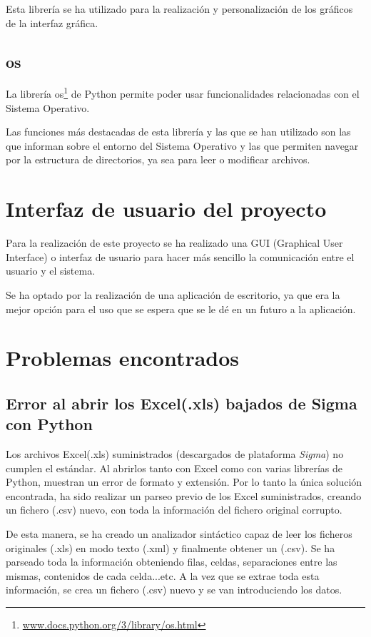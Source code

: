 Esta librería se ha utilizado para la realización y personalización de los gráficos de la interfaz gráfica.


\subsection{os}
La librería os\footnote{\href{https://docs.python.org/3/library/os.html}{www.docs.python.org/3/library/os.html}} de Python permite poder usar funcionalidades relacionadas con el Sistema Operativo. 

Las funciones más destacadas de esta librería y las que se han utilizado son las que informan sobre el entorno del Sistema Operativo y las que permiten navegar por la estructura de directorios, ya sea para leer o modificar archivos.


\section{Interfaz de usuario del proyecto}\label{interfaz_de_usuario_del_proyecto}
Para la realización de este proyecto se ha realizado una GUI (Graphical User Interface) o interfaz de usuario para hacer más sencillo la comunicación entre el usuario y el sistema.

Se ha optado por la realización de una aplicación de escritorio, ya que era la mejor opción para el uso que se espera que se le dé en un futuro a la aplicación.



\section{Problemas encontrados}

\subsection{Error al abrir los Excel(.xls) bajados de Sigma con Python}
Los archivos Excel(.xls) suministrados (descargados de plataforma \emph{Sigma}) no cumplen el estándar. Al abrirlos tanto con Excel como con varias librerías de Python, muestran un error de formato y extensión. Por lo tanto la única solución encontrada, ha sido realizar un parseo previo de los Excel suministrados, creando un fichero (.csv) nuevo, con toda la información del fichero original corrupto.

De esta manera, se ha creado un analizador sintáctico capaz de leer los ficheros originales (.xls) en modo texto (.xml) y finalmente obtener un (.csv). Se ha parseado toda la información obteniendo filas, celdas, separaciones entre las mismas, contenidos de cada celda...etc. A la vez que se extrae toda esta información, se crea un fichero (.csv) nuevo y se van introduciendo los datos.

